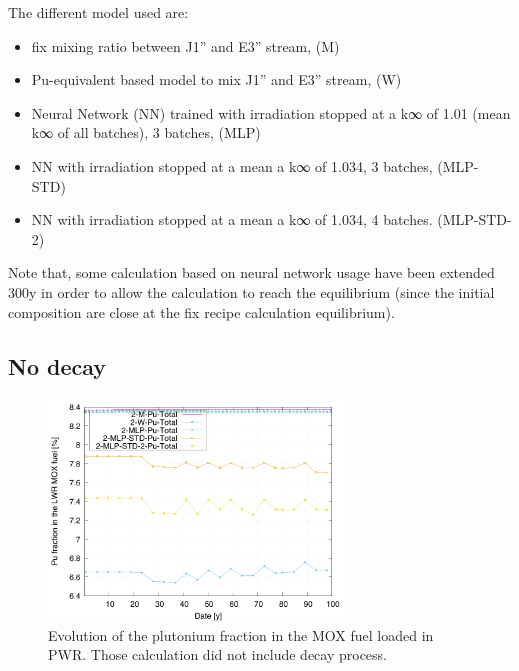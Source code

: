 \documentclass[10pt]{article}
\begin{document}
The different model used are:
\begin{itemize}
  \item fix mixing ratio between J1'' and E3'' stream, (M)
  \item	Pu-equivalent based model to mix J1'' and E3'' stream, (W)
  \item	Neural Network (NN) trained with irradiation stopped at a k∞ of 1.01 (mean k∞ of all batches), 3 batches, (MLP)
  \item	NN with irradiation stopped at a mean a k∞ of 1.034, 3 batches, (MLP-STD)
  \item	NN with irradiation stopped at a mean a k∞ of 1.034, 4 batches. (MLP-STD-2)
\end{itemize}

Note that, some calculation based on neural network usage have been extended 300y
in order to allow the calculation to reach the equilibrium (since the initial
composition are close at the fix recipe calculation equilibrium).

\subsection{No decay}

\begin{figure}[h!]
  \centering
  \includegraphics[width=0.7\textwidth]  {img/C_1_2_MOX_pu_contribution}
  \caption{Evolution of the plutonium fraction in the MOX fuel loaded in PWR.
  Those calculation did not include decay process.}
  \label{fig:pufrac_ND}
\end{figure}
%  
%  
\end{document}
